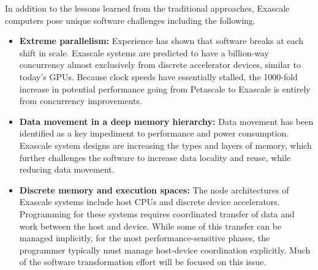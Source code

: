 In addition to the lessons learned from the traditional approaches, Exascale computers pose unique software challenges including the following.
\begin{itemize}
\item \textbf{Extreme parallelism:} Experience has shown that software breaks at each shift in scale. Exascale systems are predicted to have a billion-way concurrency almost exclusively from discrete accelerator devices, similar to today's GPUs. Because clock speeds have essentially stalled, the 1000-fold increase in potential performance going from Petascale to Exascale is entirely from concurrency improvements.
\item \textbf{Data movement in a deep memory hierarchy: }Data movement has been identified as a key impediment to performance and power consumption. Exascale system designs are increasing the types and layers of memory, which further challenges the software to increase data locality and reuse, while reducing data movement.
\item \textbf{Discrete memory and execution spaces:} The node architectures of Exascale systems include host CPUs and discrete device accelerators.  Programming for these systems requires coordinated transfer of data and work between the host and device. While some of this transfer can be managed implicitly, for the most performance-sensitive phases, the programmer typically must manage host-device coordination explicitly.  Much of the software transformation effort will be focused on this issue.
\end{itemize}
 
